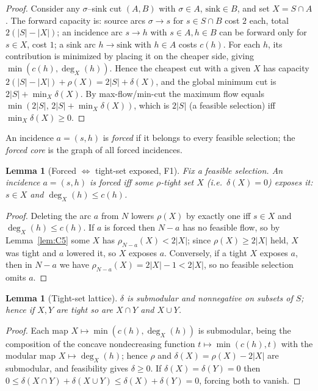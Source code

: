 \documentclass[11pt]{article}
\theoremstyle{plain}
\newtheorem{lemma}[theorem]{Lemma}
\theoremstyle{definition}
\begin{document}
\begin{proof}
Consider any $\sigma$--sink cut $(A,B)$ with $\sigma\in A$, $\text{sink}\in B$,
and set $X=S\cap A$. The forward capacity is: source arcs $\sigma\to s$ for
$s\in S\cap B$ cost $2$ each, total $2(|S|-|X|)$; an incidence arc $s\to h$ with
$s\in A,h\in B$ can be forward only for $s\in X$, cost $1$; a sink arc
$h\to\text{sink}$ with $h\in A$ costs $c(h)$. For each $h$, its contribution is
minimized by placing it on the cheaper side, giving
$\min(c(h),\deg_X(h))$. Hence the cheapest cut with a given $X$ has capacity
$2(|S|-|X|)+\rho(X)=2|S|+\delta(X)$, and the global minimum cut is
$2|S|+\min_X\delta(X)$. By max-flow/min-cut the maximum flow equals
$\min(2|S|,\,2|S|+\min_X\delta(X))$, which is $2|S|$ (a feasible selection) iff
$\min_X\delta(X)\ge0$.
\end{proof}

An incidence $a=(s,h)$ is \emph{forced} if it belongs to every feasible
selection; the \emph{forced core} is the graph of all forced incidences.

\begin{lemma}[Forced $\iff$ tight-set exposed, F1]\label{lem:F1}
Fix a feasible selection. An incidence $a=(s,h)$ is forced iff some
$\rho$-tight set $X$ (i.e.\ $\delta(X)=0$) \emph{exposes} it: $s\in X$ and
$\deg_X(h)\le c(h)$.
\end{lemma}

\begin{proof}
Deleting the arc $a$ from $N$ lowers $\rho(X)$ by exactly one iff $s\in X$ and
$\deg_X(h)\le c(h)$. If $a$ is forced then $N-a$ has no feasible flow, so by
Lemma~\ref{lem:C5} some $X$ has $\rho_{N-a}(X)<2|X|$; since $\rho(X)\ge2|X|$
held, $X$ was tight and $a$ lowered it, so $X$ exposes $a$. Conversely, if a
tight $X$ exposes $a$, then in $N-a$ we have $\rho_{N-a}(X)=2|X|-1<2|X|$, so no
feasible selection omits $a$.
\end{proof}

\begin{lemma}[Tight-set lattice]\label{lem:C6}
$\delta$ is submodular and nonnegative on subsets of $S$; hence if $X,Y$ are
tight so are $X\cap Y$ and $X\cup Y$.
\end{lemma}

\begin{proof}
Each map $X\mapsto\min(c(h),\deg_X(h))$ is submodular, being the composition of
the concave nondecreasing function $t\mapsto\min(c(h),t)$ with the modular map
$X\mapsto\deg_X(h)$; hence $\rho$ and $\delta(X)=\rho(X)-2|X|$ are submodular, and
feasibility gives $\delta\ge0$. If
$\delta(X)=\delta(Y)=0$ then
$0\le\delta(X\cap Y)+\delta(X\cup Y)\le\delta(X)+\delta(Y)=0$, forcing both to
vanish.
\end{proof}
\end{document}
